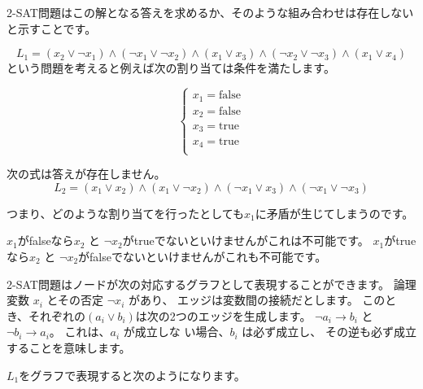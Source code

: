 2-SAT問題はこの解となる答えを求めるか、そのような組み合わせは存在しないと示すことです。

\[
L_1 = (x_2 \lor \lnot x_1) \land
      (\lnot x_1 \lor \lnot x_2) \land
      (x_1 \lor x_3) \land
      (\lnot x_2 \lor \lnot x_3) \land
      (x_1 \lor x_4)
\]
という問題を考えると例えば次の割り当ては条件を満たします。

\[
\begin{cases}
x_1 = \textrm{false} \\
x_2 = \textrm{false} \\
x_3 = \textrm{true} \\
x_4 = \textrm{true} \\
\end{cases}
\]

次の式は答えが存在しません。
\[
L_2 = (x_1 \lor x_2) \land
      (x_1 \lor \lnot x_2) \land
      (\lnot x_1 \lor x_3) \land
      (\lnot x_1 \lor \lnot x_3)
\]

つまり、どのような割り当てを行ったとしても$x_1$に矛盾が生じてしまうのです。


$x_1$がfalseなら$x_2$ と $\lnot x_2$がtrueでないといけませんがこれは不可能です。
$x_1$がtrueなら$x_2$ と $\lnot x_2$がfalseでないといけませんがこれも不可能です。

2-SAT問題はノードが次の対応するグラフとして表現することができます。
論理変数 $x_i$ とその否定 $\lnot x_i$ があり、
エッジは変数間の接続だとします。
このとき、それぞれの$(a_i \lor b_i)$は次の2つのエッジを生成します。
$\lnot a_i \to b_i$ と $\lnot b_i \to a_i$。
これは、$a_i$ が成立しな い場合、$b_i$ は必ず成立し、
その逆も必ず成立することを意味します。

$L_1$をグラフで表現すると次のようになります。


